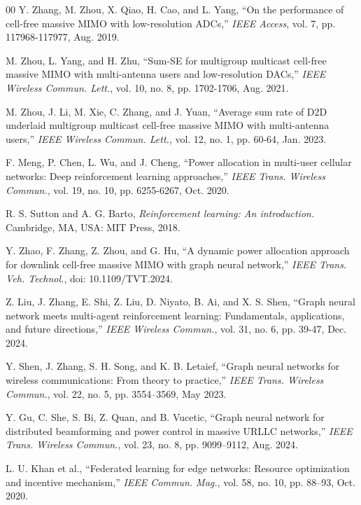 \begin{thebibliography}{00}
Y. Zhang, M. Zhou, X. Qiao, H. Cao, and L. Yang, ``On the performance of cell-free massive MIMO with low-resolution ADCs,'' \textit{IEEE Access}, vol. 7, pp. 117968-117977, Aug. 2019.

M. Zhou, L. Yang, and H. Zhu, ``Sum-SE for multigroup multicast cell-free massive MIMO with multi-antenna users and low-resolution DACs,'' \textit{IEEE Wireless Commun. Lett.}, vol. 10, no. 8, pp. 1702-1706, Aug. 2021.

M. Zhou, J. Li, M. Xie, C. Zhang, and J. Yuan, ``Average sum rate of D2D underlaid multigroup multicast cell-free massive MIMO with multi-antenna users,'' \textit{IEEE Wireless Commun. Lett.}, vol. 12, no. 1, pp. 60-64, Jan. 2023.

F. Meng, P. Chen, L. Wu, and J. Cheng, ``Power allocation in multi-user cellular networks: Deep reinforcement learning approaches,'' \textit{IEEE Trans. Wireless Commun.}, vol. 19, no. 10, pp. 6255-6267, Oct. 2020.

R. S. Sutton and A. G. Barto, \textit{Reinforcement learning: An introduction.} Cambridge, MA, USA: MIT Press, 2018.

Y. Zhao, F. Zhang, Z. Zhou, and G. Hu, ``A dynamic power allocation approach for downlink cell-free massive MIMO with graph neural network,'' \emph{IEEE Trans. Veh. Technol.}, doi: 10.1109/TVT.2024.

Z. Liu, J. Zhang, E. Shi, Z. Liu, D. Niyato, B. Ai, and X. S. Shen, ``Graph neural network meets multi-agent reinforcement learning: Fundamentals, applications, and future directions,'' \emph{IEEE Wireless Commun.}, vol. 31, no. 6, pp. 39-47, Dec. 2024.

Y. Shen, J. Zhang, S. H. Song, and K. B. Letaief, ``Graph neural networks for wireless communications: From theory to practice,'' \emph{IEEE Trans. Wireless Commun.}, vol. 22, no. 5, pp. 3554--3569, May 2023.

Y. Gu, C. She, S. Bi, Z. Quan, and B. Vucetic, ``Graph neural network for distributed beamforming and power control in massive URLLC networks,'' \textit{IEEE Trans. Wireless Commun.}, vol. 23, no. 8, pp. 9099--9112, Aug. 2024.

L. U. Khan et al., ``Federated learning for edge networks: Resource optimization and incentive mechanism,'' \textit{IEEE Commun. Mag.}, vol. 58, no. 10, pp. 88--93, Oct. 2020.


\end{thebibliography}
